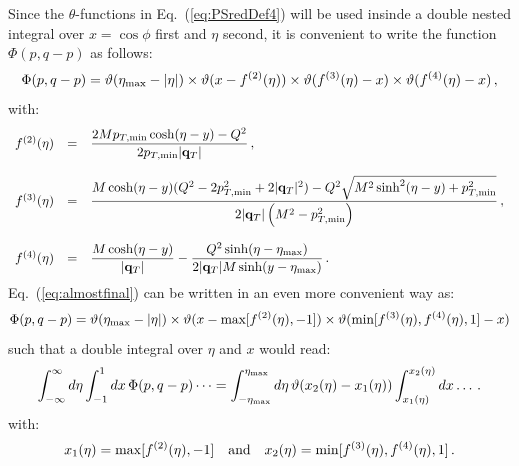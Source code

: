 \documentclass[10pt,a4paper]{article}
\begin{document}
Since the $\theta$-functions in Eq.~(\ref{eq:PSredDef4}) will be used
insinde a double nested integral over $x=\cos\phi$ first and $\eta$
second, it is convenient to write the function $\Phi(p,q-p)$ as
follows:
\begin{equation}\label{eq:almostfinal}
\Phi(p,q-p) = \vartheta(\eta_{\rm max}-|\eta|) \times \vartheta(x - f^{(2)}(\eta)) \times \vartheta(f^{(3)}(\eta)-x) \times \vartheta(f^{(4)}(\eta)-x)\,,
\end{equation}
with:
\begin{equation}\label{eq:relevantfuncs}
\begin{array}{rcl}
f^{(2)}(\eta) & = &\displaystyle \frac{2M p_{T,\rm min}\cosh(\eta-y) 
                    - Q^{2}}{2p_{T,\rm min}
                    |\mathbf{q}_T|}\,,\\
\\
f^{(3)}(\eta) & = &\displaystyle \frac{M \cosh(\eta-y)(Q^2 - 2
                    p_{T,\rm min}^{2} + 2 |\mathbf{q}_T|^2)- Q^{2} \sqrt{M^{2} \sinh ^{2} (\eta-y) + p_{T,\rm min}^{2} }}{2 |\mathbf{q}_T| \left(M^{2} - p_{T,\rm min}^{2}\right)}\,, \\
\\
f^{(4)}(\eta) & = &\displaystyle \frac{M \cosh(\eta-y)}{|\mathbf{q}_T| }-\frac{Q^{2} \sinh(\eta -\eta_{\rm max})}{2|\mathbf{q}_T|  M\sinh(y -\eta_{\rm max})}\,.
\end{array}
\end{equation}
Eq.~(\ref{eq:almostfinal}) can be written in an even more convenient
way as:
\begin{equation}\label{eq:final}
\Phi(p,q-p) = \vartheta(\eta_{\rm max}-|\eta|) \times \vartheta(x - \mbox{max}[f^{(2)}(\eta),-1])\times\vartheta(\mbox{min}[f^{(3)}(\eta),f^{(4)}(\eta),1]-x)
\end{equation}
such that a double integral over $\eta$ and $x$ would read:
\begin{equation}
\int_{-\infty}^{\infty}d\eta\int_{-1}^{1}dx\,\Phi(p,q-p)\dots =
\int_{-\eta_{\rm max}}^{\eta_{\rm
    max}}d\eta\,\vartheta(x_2(\eta)-x_1(\eta))\int_{x_1(\eta)}^{x_2(\eta)}dx\dots\,.
\end{equation}
with:
\begin{equation}
x_1(\eta) = {\rm max}[f^{(2)}(\eta),-1]\quad\mbox{and}\quad x_2(\eta) = {\rm min}[f^{(3)}(\eta),f^{(4)}(\eta),1]\,.
\end{equation}
\end{document}
